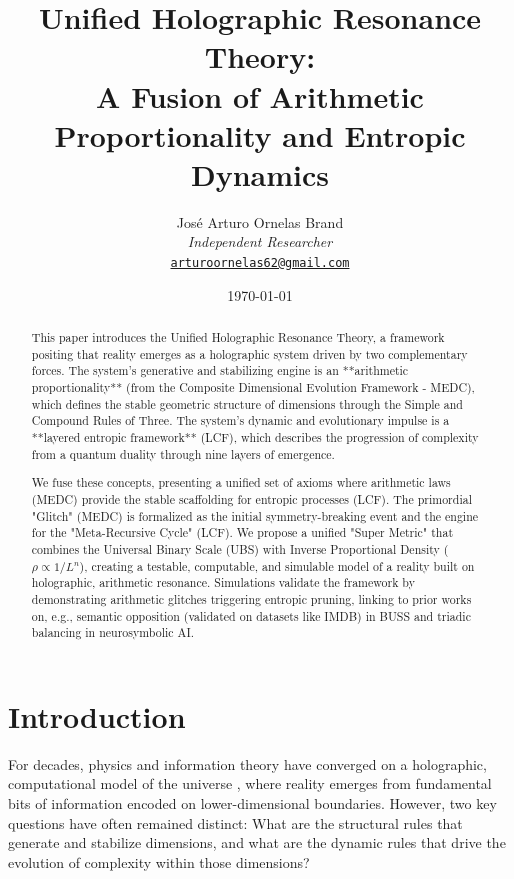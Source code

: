 \documentclass[11pt, a4paper]{article}
\title{\textbf{Unified Holographic Resonance Theory: \\ A Fusion of Arithmetic Proportionality and Entropic Dynamics}}
\author{
		José Arturo Ornelas Brand \\
		\textit{Independent Researcher} \\
		\href{mailto:arturoornelas62@gmail.com}{\texttt{arturoornelas62@gmail.com}}
	}
\date{\today}
\begin{document}
		
		\maketitle
		\tableofcontents
		\newpage
		
		\begin{abstract}
			This paper introduces the Unified Holographic Resonance Theory, a framework positing that reality emerges as a holographic system driven by two complementary forces. The system's generative and stabilizing engine is an **arithmetic proportionality** (from the Composite Dimensional Evolution Framework - MEDC), which defines the stable geometric structure of dimensions through the Simple and Compound Rules of Three. The system's dynamic and evolutionary impulse is a **layered entropic framework** (LCF), which describes the progression of complexity from a quantum duality through nine layers of emergence.
			
			We fuse these concepts, presenting a unified set of axioms where arithmetic laws (MEDC) provide the stable scaffolding for entropic processes (LCF). The primordial "Glitch" (MEDC) is formalized as the initial symmetry-breaking event and the engine for the "Meta-Recursive Cycle" (LCF). We propose a unified "Super Metric" that combines the Universal Binary Scale (UBS) with Inverse Proportional Density ($\rho \propto 1/L^n$), creating a testable, computable, and simulable model of a reality built on holographic, arithmetic resonance. Simulations validate the framework by demonstrating arithmetic glitches triggering entropic pruning, linking to prior works on, e.g., semantic opposition (validated on datasets like IMDB) in BUSS and triadic balancing in neurosymbolic AI.
		\end{abstract}
		
		\section{Introduction}
		For decades, physics and information theory have converged on a holographic, computational model of the universe \cite{wheeler1990, maldacena1999, bousso2002, susskind1995}, where reality emerges from fundamental bits of information encoded on lower-dimensional boundaries. However, two key questions have often remained distinct: What are the structural rules that generate and stabilize dimensions, and what are the dynamic rules that drive the evolution of complexity within those dimensions?
		
\end{document}
